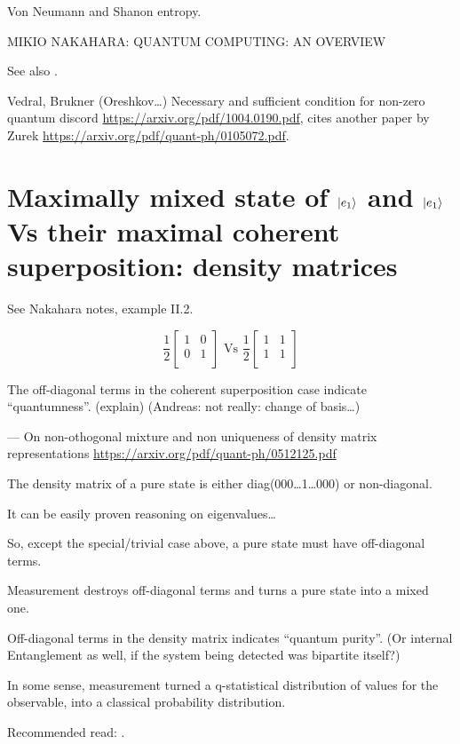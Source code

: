 Von Neumann and Shanon entropy.

MIKIO NAKAHARA: QUANTUM COMPUTING: AN OVERVIEW

See also \cite{Schlosshauer_Decoherence}.

Vedral, Brukner (Oreshkov\dots)
Necessary and sufficient condition for non-zero quantum discord
\url{https://arxiv.org/pdf/1004.0190.pdf},
cites another paper by Zurek \url{https://arxiv.org/pdf/quant-ph/0105072.pdf}.

\section{Maximally mixed state of $\ket{e_1}$ and $\ket{e_1}$
Vs their maximal coherent superposition: density matrices}

See Nakahara notes, example II.2.

$$
\frac{1}{2}\begin{bmatrix}
  1 &0  \\
  0 &1  \\
\end{bmatrix}
\text{ Vs }
\frac{1}{2}\begin{bmatrix}
  1 &1  \\
  1 &1  \\
\end{bmatrix}
$$

The off-diagonal terms in the coherent superposition case indicate
``quantumness''. (explain) (Andreas: not really: change of basis\dots)

--- On non-othogonal mixture and non uniqueness of density matrix representations
\url{https://arxiv.org/pdf/quant-ph/0512125.pdf}

\begin{remark}
  The density matrix of a pure state is either diag(000\dots1\dots000) or non-diagonal.

  It can be easily proven reasoning on eigenvalues\dots

  So, except the special/trivial case above, a pure state must have off-diagonal terms.
\end{remark}

Measurement destroys off-diagonal terms and turns a pure state into a mixed one.

Off-diagonal terms in the density matrix indicates ``quantum purity''.
(Or internal Entanglement as well, if the system being detected was bipartite itself?)

In some sense, measurement turned a q-statistical distribution of values for the observable,
into a classical probability distribution.

Recommended read: \cite{Zurek_Decoherence, Zurek_Fundamentals}.
